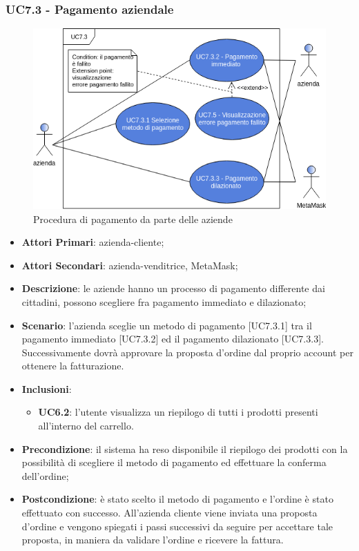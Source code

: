 \subsubsection{UC7.3 - Pagamento aziendale}
\begin{figure}[H]
	\includegraphics[width=14cm]{res/images/UC7-PagamentoAzienda.png}
	\centering
	\caption{Procedura di pagamento da parte delle aziende}
\end{figure}
\begin{itemize}
	\item \textbf{Attori Primari}: azienda-cliente;
	\item \textbf{Attori Secondari}: azienda-venditrice, MetaMask\glo;
	\item \textbf{Descrizione}: le aziende hanno un processo di pagamento differente dai cittadini, possono scegliere fra pagamento immediato e dilazionato\glo;
	\item \textbf{Scenario}: l'azienda sceglie un metodo di pagamento [UC7.3.1] tra il pagamento immediato [UC7.3.2] ed il pagamento dilazionato [UC7.3.3]. Successivamente dovrà approvare la proposta d'ordine dal proprio account per ottenere la fatturazione.
	\item \textbf{Inclusioni}: 
	\begin{itemize}
		\item \textbf{UC6.2}: l'utente visualizza un riepilogo di tutti i prodotti presenti all'interno del carrello.
	\end{itemize}
	\item \textbf{Precondizione}: il sistema ha reso disponibile il riepilogo dei prodotti con la possibilità di scegliere il metodo di pagamento ed effettuare la conferma dell'ordine;
	\item \textbf{Postcondizione}: è stato scelto il metodo di pagamento e l'ordine è stato effettuato con successo. All'azienda cliente viene inviata una proposta d'ordine e vengono spiegati i passi successivi da seguire per accettare tale proposta, in maniera da validare l'ordine e ricevere la fattura.
\end{itemize} 

